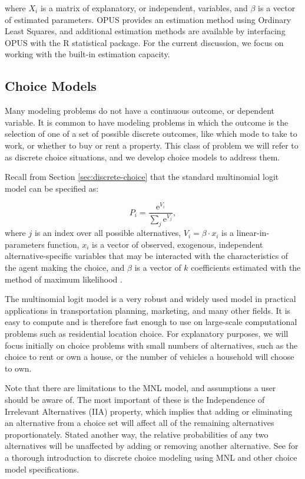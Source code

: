 where $X_i$ is a matrix of explanatory, or independent, variables, and $\beta$ is a vector of estimated parameters.  OPUS provides an estimation method using Ordinary Least Squares, and additional estimation methods are available by interfacing OPUS with the R statistical package.  For the current discussion, we focus on working with the built-in estimation capacity.

\subsection{Choice Models}

Many modeling problems do not have a continuous outcome, or dependent variable.  It is common to have modeling problems in which the outcome is the selection of one of a set of possible discrete outcomes, like which mode to take to work, or whether to buy or rent a property.  This class of problem we will refer to as discrete choice situations, and we develop choice models to address them.

Recall from Section \ref{sec:discrete-choice} that the standard multinomial logit model \cite{mcfadden-1974,mcfadden-1981} can be specified as:

\begin{equation}
    P_i = \frac{\mathrm{e}^{V_i}}{\sum_j \mathrm{e}^{V_j}},
    \label{eq:mnl}
\end{equation}
where $j$ is an index over all possible alternatives,
$V_i = \beta\cdot {x}_i$ is a linear-in-parameters
function, $x_i$ is a vector of observed, exogenous, independent
alternative-specific variables that may be interacted with the
characteristics of the agent making the choice,
and $\beta$ is a vector of $k$ coefficients
estimated with the method of maximum likelihood \cite{Greene-2002}.

The multinomial logit model is a very robust and widely used model in practical applications in transportation planning, marketing, and many other fields.  It is easy to compute and is therefore fast enough to use on large-scale computational problems such as residential location choice.  For explanatory purposes, we will focus initially on choice problems with small numbers of alternatives, such as the choice to rent or own a house, or the number of vehicles a household will choose to own.

Note that there are limitations to the MNL model, and assumptions a user should be aware of.  The most important of these is the Independence of Irrelevant Alternatives (IIA) property, which implies that adding or eliminating an alternative from a choice set will affect all of the remaining alternatives proportionately.  Stated another way, the relative probabilities of any two alternatives will be unaffected by adding or removing another alternative.  See \cite{train-book-2003} for a thorough introduction to discrete choice modeling using MNL and other choice model specifications.

